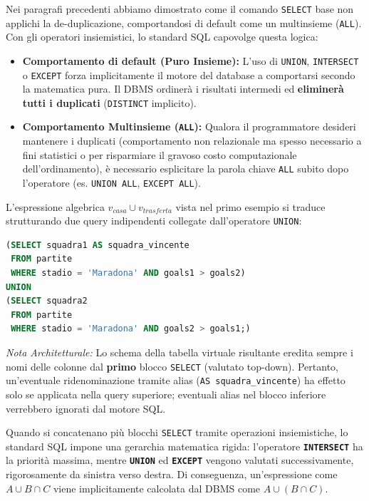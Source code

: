 Nei paragrafi precedenti abbiamo dimostrato come il comando \texttt{SELECT} base non applichi la de-duplicazione, comportandosi di default come un multinsieme (\texttt{ALL}).
Con gli operatori insiemistici, lo standard SQL capovolge questa logica:

\begin{itemize}
    \item \textbf{Comportamento di default (Puro Insieme):} L'uso di \texttt{UNION}, \texttt{INTERSECT} o \texttt{EXCEPT} forza implicitamente il motore del database a comportarsi secondo la matematica pura. Il DBMS ordinerà i risultati intermedi ed \textbf{eliminerà tutti i duplicati} (\texttt{DISTINCT} implicito).
    \item \textbf{Comportamento Multinsieme (\texttt{ALL}):} Qualora il programmatore desideri mantenere i duplicati (comportamento non relazionale ma spesso necessario a fini statistici o per risparmiare il gravoso costo computazionale dell'ordinamento), è necessario esplicitare la parola chiave \texttt{ALL} subito dopo l'operatore (es. \texttt{UNION ALL}, \texttt{EXCEPT ALL}).
\end{itemize}

\begin{example}
    L'espressione algebrica $v_{casa} \cup v_{trasferta}$ vista nel primo esempio si traduce strutturando due query indipendenti collegate dall'operatore \texttt{UNION}:
    
\begin{lstlisting}[language=SQL, basicstyle=\ttfamily\small, keywordstyle=\color{blue}\bfseries]
(SELECT squadra1 AS squadra_vincente
 FROM partite
 WHERE stadio = 'Maradona' AND goals1 > goals2)
UNION
(SELECT squadra2 
 FROM partite
 WHERE stadio = 'Maradona' AND goals2 > goals1;)
\end{lstlisting}

    \textit{Nota Architetturale:} Lo schema della tabella virtuale risultante eredita sempre i nomi delle colonne dal \textbf{primo} blocco \texttt{SELECT} (valutato top-down). Pertanto, un'eventuale ridenominazione tramite alias (\texttt{AS squadra\_vincente}) ha effetto solo se applicata nella query superiore; eventuali alias nel blocco inferiore verrebbero ignorati dal motore SQL.
\end{example}

Quando si concatenano più blocchi \texttt{SELECT} tramite operazioni insiemistiche, lo standard SQL impone una gerarchia matematica rigida: l'operatore \textbf{\texttt{INTERSECT}} ha la priorità massima, mentre \textbf{\texttt{UNION}} ed \textbf{\texttt{EXCEPT}} vengono valutati successivamente, rigorosamente da sinistra verso destra. Di conseguenza, un'espressione come $A \cup B \cap C$ viene implicitamente calcolata dal DBMS come $A \cup (B \cap C)$.


